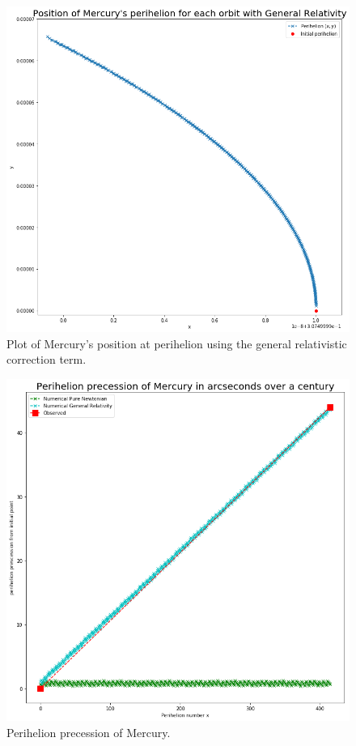 \documentclass[a4paper, fontsize=11pt]{article}
\begin{document}
\begin{figure}[H]
\centering
\includegraphics[scale=0.5]{plots/GeneralRelativityMercury}
\caption{Plot of Mercury's position at perihelion using the general relativistic correction term.}
\label{GRMercury}
\end{figure}


\begin{figure}[H]
\centering
\includegraphics[scale=0.5]{plots/PerihelionPrecessionMercury}
\caption{Perihelion precession of Mercury.}
\label{PerihelionMercury}
\end{figure}
\end{document}
